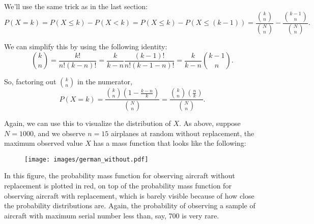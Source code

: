 \documentclass[11pt]{article}
\begin{document}
We'll use the same trick as in the last section:
$$
P(X = k) = P(X \leq k) - P(X < k) = P(X \leq k) - P(X \leq (k-1)) = \frac{{k \choose n}}{{N \choose n}} - \frac{{k-1 \choose n}}{{N \choose n}}.
$$

We can simplify this by using the following identity:
$$
    {k \choose n} = \frac{k!}{n!(k-n)!} = \frac{k}{k-n}\frac{(k-1)!}{n!(k-1-n)!} = \frac{k}{k-n} {k-1 \choose n}.
$$

So, factoring out ${k \choose n}$ in the numerator,
$$
P(X = k) = \frac{{k \choose n}\left(1 - \frac{k-n}{k}\right)}{{N \choose n}} = \frac{{k \choose n}\left(\frac{n}{k}\right)}{{N \choose n}}.
$$

Again, we can use this to visualize the distribution of $X$. As above, suppose $N = 1000$, and we observe $n = 15$ airplanes at random without replacement, the maximum observed value $X$ has a
mass function that looks like the following:

\begin{figure}[h!]
    \centering
    \texttt{[image: images/german\_without.pdf]}
\end{figure}

In this figure, the probability mass function for observing aircraft without replacement is plotted in red, on top of the probability mass function for observing aircraft with replacement, which is barely visible because of how close the probability distributions are. Again, the probability of observing a sample of aircraft with maximum serial number less than, say, 700 is very rare.
\end{document}
